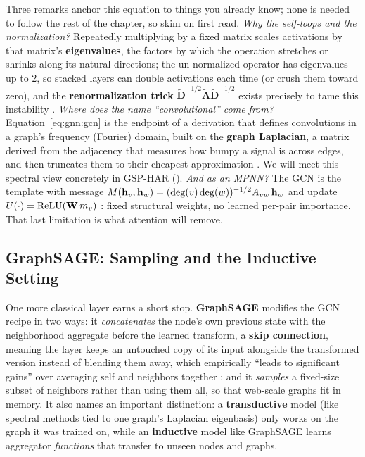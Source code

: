 Three remarks anchor this equation to things you already know; none is needed to follow the rest of the chapter, so skim on first read. \emph{Why the self-loops and the normalization?} Repeatedly multiplying by a fixed matrix scales activations by that matrix's \textbf{eigenvalues}, the factors by which the operation stretches or shrinks along its natural directions; the un-normalized operator has eigenvalues up to 2, so stacked layers can double activations each time (or crush them toward zero), and the \textbf{renormalization trick} $\tilde{\mathbf{D}}^{-1/2}\tilde{\mathbf{A}}\tilde{\mathbf{D}}^{-1/2}$ exists precisely to tame this instability \citep[p.~3]{KipfWelling2017}. \emph{Where does the name ``convolutional'' come from?} Equation~\eqref{eq:gnn:gcn} is the endpoint of a derivation that defines convolutions in a graph's frequency (Fourier) domain, built on the \textbf{graph Laplacian}, a matrix derived from the adjacency that measures how bumpy a signal is across edges, and then truncates them to their cheapest approximation \citep[eqs.~3--8]{KipfWelling2017}. We will meet this spectral view concretely in GSP-HAR (). \emph{And as an MPNN?} The GCN is the template with message $M(\mathbf{h}_v, \mathbf{h}_w) = (\deg(v)\deg(w))^{-1/2} A_{vw}\, \mathbf{h}_w$ and update $U(\cdot) = \operatorname{ReLU}(\mathbf{W}\, m_v)$ \citep[p.~4]{Gilmer2017}: fixed structural weights, no learned per-pair importance. That last limitation is what attention will remove.

\subsection{GraphSAGE: Sampling and the Inductive Setting}\label{sec:gnn:graphsage}

One more classical layer earns a short stop. \textbf{GraphSAGE} \citep{Hamilton2017} modifies the GCN recipe in two ways: it \emph{concatenates} the node's own previous state with the neighborhood aggregate before the learned transform, a \textbf{skip connection}, meaning the layer keeps an untouched copy of its input alongside the transformed version instead of blending them away, which empirically ``leads to significant gains'' over averaging self and neighbors together \citep[p.~5]{Hamilton2017}; and it \emph{samples} a fixed-size subset of neighbors rather than using them all, so that web-scale graphs fit in memory. It also names an important distinction: a \textbf{transductive} model (like spectral methods tied to one graph's Laplacian eigenbasis) only works on the graph it was trained on, while an \textbf{inductive} model like GraphSAGE learns aggregator \emph{functions} that transfer to unseen nodes and graphs.

